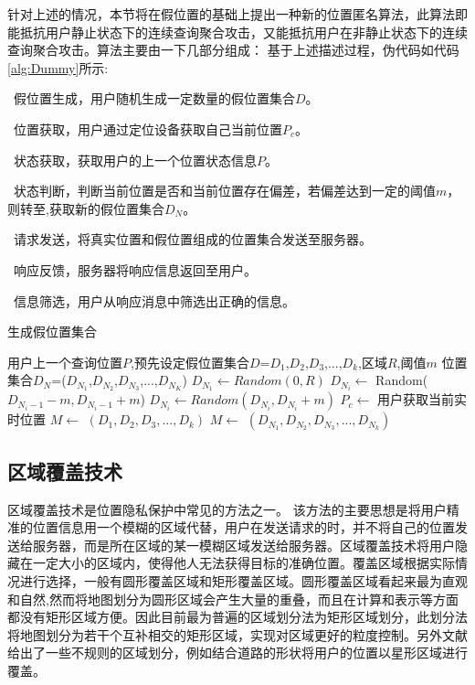 针对上述的情况，本节将在假位置的基础上提出一种新的位置匿名算法，此算法即能抵抗用户静止状态下的连续查询聚合攻击，又能抵抗用户在非静止状态下的连续查询聚合攻击。算法主要由一下几部分组成：
基于上述描述过程，伪代码如代码\ref{alg:Dummy}所示:

~假位置生成，用户随机生成一定数量的假位置集合$D$。

~位置获取，用户通过定位设备获取自己当前位置$P_c$。

~状态获取，获取用户的上一个位置状态信息$P$。

~状态判断，判断当前位置是否和当前位置存在偏差，若偏差达到一定的阈值$m$，则转至,获取新的假位置集合$D_N$。

~请求发送，将真实位置和假位置组成的位置集合发送至服务器。

~响应反馈，服务器将响应信息返回至用户。

~信息筛选，用户从响应消息中筛选出正确的信息。\\
\begin{algorithm}[!htb]
\small
\renewcommand{\algorithmicrequire}{\textbf{Input:}}
\renewcommand{\algorithmicensure}{\textbf{Output:}}
\caption{生成假位置集合}
\label{alg:Dummy}
\begin{algorithmic}[1]
    \REQUIRE 用户上一个查询位置$P$,预先设定假位置集合$D$={$D_1$,$D_2$,$D_3$,...,$D_k$},区域$R$,阈值$m$
    \ENSURE 位置集合$D_N$=($D_{N_1}$,$D_{N_2}$,$D_{N_3}$,...,$D_{N_K}$)
    \STATE $D_{N_1} \gets Random(0,R)$
        \STATE $D_{N_i} \gets $ Random($D_{N_i-1}-m,D_{N_i-1}+m$)
            \STATE $D_{N_i} \gets Random(D_{N_i},D_{N_i}+m)$
        \ENDIF
    \ENDFOR
    \STATE $P_c \gets$ 用户获取当前实时位置
        \STATE $M \gets$ $(D_1,D_2,D_3,...,D_k)$
    \ELSE
        \STATE $M \gets $ $(D_{N_1},D_{N_2},D_{N_3},...,D_{N_k})$
    \ENDIF
\end{algorithmic}
\end{algorithm}

\subsection{区域覆盖技术}
区域覆盖技术是位置隐私保护中常见的方法之一\cite{Mokbel}\cite{xu2010privacy}\cite{xu2009feeling}。 该方法的主要思想是将用户精准的位置信息用一个模糊的区域代替，用户在发送请求的时，并不将自己的位置发送给服务器，而是所在区域的某一模糊区域发送给服务器。区域覆盖技术将用户隐藏在一定大小的区域内，使得他人无法获得目标的准确位置。覆盖区域根据实际情况进行选择，一般有圆形覆盖区域和矩形覆盖区域。圆形覆盖区域看起来最为直观和自然\cite{ardagna2007location}\cite{kalnis2007preventing},然而将地图划分为圆形区域会产生大量的重叠，而且在计算和表示等方面都没有矩形区域方便。因此目前最为普遍的区域划分法为矩形区域划分，此划分法将地图划分为若干个互补相交的矩形区域，实现对区域更好的粒度控制。另外文献\cite{wang2009privacy}\cite{hossain2011h}给出了一些不规则的区域划分，例如结合道路的形状将用户的位置以星形区域进行覆盖。

